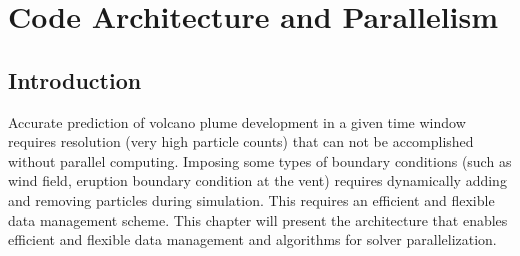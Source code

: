 \chapter{Code Architecture and Parallelism} \label{chapter:architecture-parallelism}

\section{Introduction}
\label{sect:introduction}
Accurate prediction of volcano plume development in a given time window requires resolution (very high particle counts) that can not be accomplished without parallel computing. Imposing some types of boundary conditions (such as wind field, eruption boundary condition at the vent) requires dynamically adding and removing particles during simulation. This requires an efficient and flexible data management scheme. This chapter will present the architecture that enables efficient and flexible data management and algorithms for solver parallelization.

